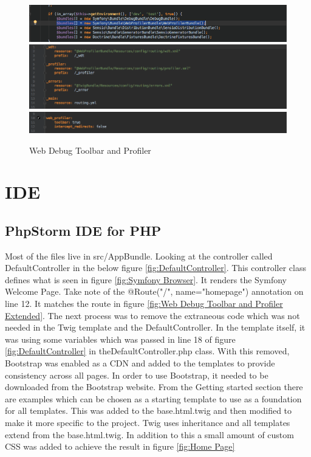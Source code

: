 \begin{figure}[htbp]
   \centering
   \includegraphics[width=400pt]{figures/AppKernel.png}
   \includegraphics[width=400pt]{figures/routing_dev.png}
   \includegraphics[width=400pt]{figures/config_dev.png} %
   \caption{Web Debug Toolbar and Profiler}
   \label{fig:Web Debug Toolbar and Profiler}
\end{figure}

\section{IDE}

\subsection{PhpStorm IDE for PHP}

Most of the files live in src/AppBundle. Looking at the controller called DefaultController in the below figure \ref{fig:DefaultController}. This controller class defines what is seen in figure \ref{fig:Symfony Browser}. It renders the Symfony Welcome Page. Take note of the @Route("/", name="homepage") annotation on line 12. It matches the route in figure \ref{fig:Web Debug Toolbar and Profiler Extended}. The next process was to remove the extraneous code which was not needed in the Twig template and the DefaultController. In the template itself, it was using some variables which was passed in line 18 of figure \ref{fig:DefaultController} in the\newline DefaultController.php class. With this removed, Bootstrap was enabled as a CDN and added to the templates to provide consistency across all pages. In order to use Bootstrap, it needed to be downloaded from the Bootstrap website. From the Getting started section there are examples which can be chosen as a starting template to use as a foundation for all templates. This was added to the base.html.twig and then modified to make it more specific to the project. Twig uses inheritance and all templates extend from the base.html.twig. In addition to this a small amount of custom CSS was added to achieve the result in figure \ref{fig:Home Page}


